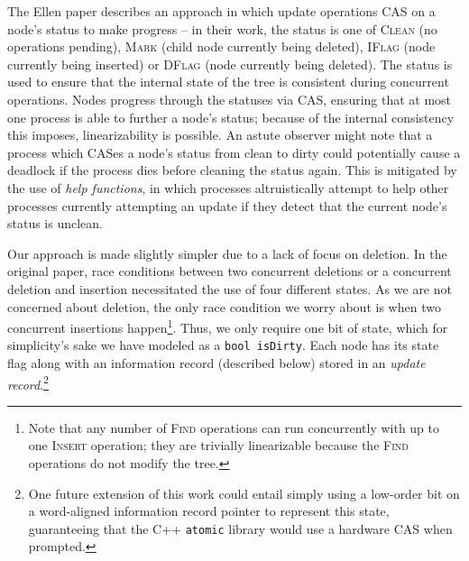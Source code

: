 \documentclass[10pt,pdftex,a4paper]{article}%
\begin{document}
\begin{multicols}{2}
The Ellen paper describes an approach in which update operations CAS on a node's status to make progress -- in their work, the status is one of \textsc{Clean} (no operations pending), \textsc{Mark} (child node currently being deleted), \textsc{IFlag} (node currently being inserted) or \textsc{DFlag} (node currently being deleted).  The status is used to ensure that the internal state of the tree is consistent during concurrent operations.  Nodes progress through the statuses via CAS, ensuring that at most one process is able to further a node's status; because of the internal consistency this imposes, linearizability is possible.  An astute observer might note that a process which CASes a node's status from clean to dirty could potentially cause a deadlock if the process dies before cleaning the status again.  This is mitigated by the use of \textit{help functions}, in which processes altruistically attempt to help other processes currently attempting an update if they detect that the current node's status is unclean.

Our approach is made slightly simpler due to a lack of focus on deletion.  In the original paper, race conditions between two concurrent deletions or a concurrent deletion and insertion necessitated the use of four different states.  As we are not concerned about deletion, the only race condition we worry about is when two concurrent insertions happen\footnote{Note that any number of \textsc{Find} operations can run concurrently with up to one \textsc{Insert} operation; they are trivially linearizable because the \textsc{Find} operations do not modify the tree.}.  Thus, we only require one bit of state, which for simplicity's sake we have modeled as a \texttt{bool isDirty}.  Each node has its state flag along with an information record (described below) stored in an \textit{update record}.\footnote{One future extension of this work could entail simply using a low-order bit on a word-aligned information record pointer to represent this state, guaranteeing that the C++ \texttt{atomic} library would use a hardware CAS when prompted.}


\end{multicols}
\end{document}
